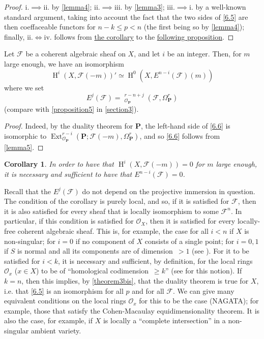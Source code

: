 \documentclass{article}
\theoremstyle{plain}
\newenvironment{proposition}[1]
  {\renewcommand\theinnercustomproposition{#1}\innercustomproposition}
  {\endinnercustomproposition}
\newtheorem*{corollary*}{Corollary}
\theoremstyle{definition}
\newcommand{\sh}{\mathscr}
\newcommand{\bb}{\mathbf}
\renewcommand{\geq}{\geqslant}
\renewcommand{\leq}{\leqslant}
\DeclareMathOperator{\Ext}{Ext}
\DeclareMathOperator{\shExt}{\underline{Ext}}
\DeclareMathOperator{\HH}{H}
\newcommand{\oldpage}[1]{\marginpar{\footnotesize$\Big\vert$ \textit{p.~#1}}}
\begin{document}
\begin{proof}
  i.$\implies$ii. by \cref{lemma4};
  ii.$\implies$iii. by \cref{lemma3};
  iii.$\implies$i. by a well-known standard argument, taking into account the fact that the two sides of \cref{6.5} are then coeffaceable functors for $n-k\leq p< n$ (the first being so by \cref{lemma4});
  finally, ii.$\iff$iv. follows from \hyperref[proposition6corollary]{the corollary} to the \hyperref[proposition6]{following proposition}.
\end{proof}

\begin{proposition}{6}
\label{proposition6}
  Let $\sh{F}$ be a coherent algebraic sheaf on $X$, and let $i$ be an integer.
  Then, for $m$ large enough, we have an isomorphism
  \[
  \label{6.6}
    \HH^i(X,\sh{F}(-m))' \simeq \HH^0(X,E^{n-i}(\sh{F})(m))
  \tag{6.6}
  \]
  where we set
  \[
  \label{6.7}
    E^j(\sh{F}) = \shExt_{\sh{O}_\bb{P}}^{r-n+j}(\sh{F},\Omega_\bb{P}^r)
  \tag{6.7}
  \]
  (compare with \cref{proposition5} in \cref{section3}).
\end{proposition}

\begin{proof}
  Indeed, by the duality theorem for $\bb{P}$, the left-hand side of \cref{6.6} is isomorphic to $\Ext_{\sh{O}_\bb{P}}^{r-i}(\bb{P};\sh{F}(-m),\Omega_\bb{P}^r)$, and so \cref{6.6} follows from \cref{lemma5}.
\end{proof}

\oldpage{149-19}
\begin{corollary*}
\label{proposition6corollary}
  In order to have that $\HH^i(X,\sh{F}(-m))=0$ for $m$ large enough, it is necessary and sufficient to have that $E^{n-i}(\sh{F})=0$.
\end{corollary*}

Recall that the $E^j(\sh{F})$ do not depend on the projective immersion in question.
The condition of the corollary is purely local, and so, if it is satisfied for $\sh{F}$, then it is also satisfied for every sheaf that is locally isomorphism to some $\sh{F}^n$.
In particular, if this condition is satisfied for $\sh{O}_X$, then it is satisfied for every locally-free coherent algebraic sheaf.
This is, for example, the case for all $i<n$ if $X$ is non-singular; for $i=0$ if no component of $X$ consists of a single point; for $i=0,1$ if $S$ is normal and all its components are of dimension~$>1$ (see \cite{3}).
For it to be satisfied for $i<k$, it is necessary and sufficient, by definition, for the local rings $\sh{O}_x$ ($x\in X$) to be of ``homological codimension~$\geq k$'' (see \cite{4} for this notion).
If $k=n$, then this implies, by \cref{theorem3bis}, that the duality theorem is true for $X$, i.e. that \cref{6.5} is an isomorphism for all $p$ and for all $\sh{F}$.
We can give many equivalent conditions on the local rings $\sh{O}_x$ for this to be the case (NAGATA);
for example, those that satisfy the Cohen-Macaulay equidimensionality theorem.
It is also the case, for example, if $X$ is locally a ``complete intersection'' in a non-singular ambient variety.
\end{document}
